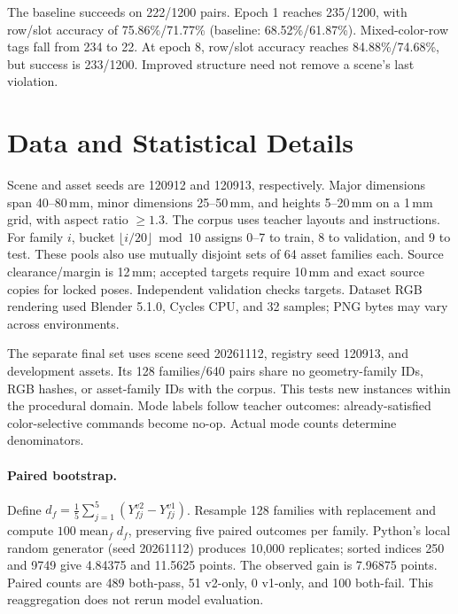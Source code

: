 The baseline succeeds on 222/1200 pairs. Epoch 1 reaches 235/1200, with row/slot accuracy of 75.86\%/71.77\% (baseline: 68.52\%/61.87\%). Mixed-color-row tags fall from 234 to 22. At epoch 8, row/slot accuracy reaches 84.88\%/74.68\%, but success is 233/1200. Improved structure need not remove a scene's last violation.

\section{Data and Statistical Details}
\label{app:statistics}
Scene and asset seeds are 120912 and 120913, respectively. Major dimensions span 40--80\,mm, minor dimensions 25--50\,mm, and heights 5--20\,mm on a 1\,mm grid, with aspect ratio $\geq1.3$. The corpus uses  teacher layouts and  instructions. For family $i$, bucket $\lfloor i/20\rfloor\bmod10$ assigns 0--7 to train, 8 to validation, and 9 to test. These pools also use mutually disjoint sets of 64 asset families each. Source clearance/margin is 12\,mm; accepted targets require 10\,mm and exact source copies for locked poses. Independent validation checks targets. Dataset RGB rendering used Blender 5.1.0, Cycles CPU, and 32 samples; PNG bytes may vary across environments.

The separate final set uses scene seed 20261112, registry seed 120913, and development assets. Its 128 families/640 pairs share no geometry-family IDs, RGB hashes, or asset-family IDs with the corpus. This tests new instances within the procedural domain. Mode labels follow teacher outcomes: already-satisfied color-selective commands become no-op. Actual mode counts determine denominators.

\paragraph{Paired bootstrap.}
Define $d_f=\frac15\sum_{j=1}^{5}(Y^{v2}_{fj}-Y^{v1}_{fj})$. Resample 128 families with replacement and compute $100\operatorname{mean}_f d_f$, preserving five paired outcomes per family. Python's local random generator (seed 20261112) produces 10,000 replicates; sorted indices 250 and 9749 give 4.84375 and 11.5625 points. The observed gain is 7.96875 points. Paired counts are 489 both-pass, 51 v2-only, 0 v1-only, and 100 both-fail. This reaggregation does not rerun model evaluation.

